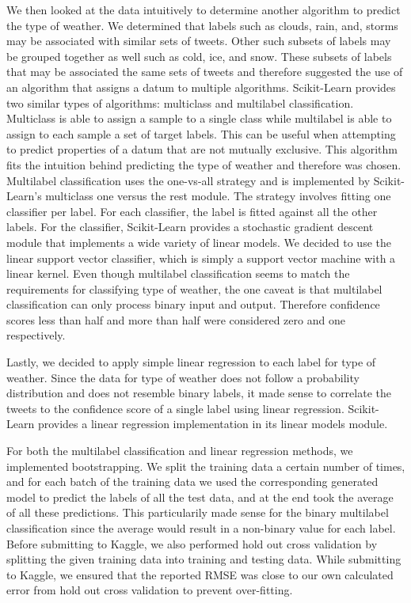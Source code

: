 \documentclass{article}
\begin{document}
We then looked at the data intuitively to determine another algorithm to predict the type of weather. We determined that labels such as clouds, rain, and, storms may be associated with similar sets of tweets. Other such subsets of labels may be grouped together as well such as cold, ice, and snow. These subsets of labels that may be associated the same sets of tweets and therefore suggested the use of an algorithm that assigns a datum to multiple algorithms. Scikit-Learn provides two similar types of algorithms: multiclass and multilabel classification. Multiclass is able to assign a sample to a single class while multilabel is able to assign to each sample a set of target labels. This can be useful when attempting to predict properties of a datum that are not mutually exclusive. This algorithm fits the intuition behind predicting the type of weather and therefore was chosen. Multilabel classification uses the one-vs-all strategy and is implemented by Scikit-Learn's multiclass one versus the rest module. The strategy involves fitting one classifier per label. For each classifier, the label is fitted against all the other labels. For the classifier, Scikit-Learn provides a stochastic gradient descent module that implements a wide variety of linear models. We decided to use the linear support vector classifier, which is simply a support vector machine with a linear kernel. Even though multilabel classification seems to match the requirements for classifying type of weather, the one caveat is that multilabel classification can only process binary input and output. Therefore confidence scores less than half and more than half were considered zero and one respectively.


Lastly, we decided to apply simple linear regression to each label for type of weather. Since the data for type of weather does not follow a probability distribution and does not resemble binary labels, it made sense to correlate the tweets to the confidence score of a single label using linear regression. Scikit-Learn provides a linear regression implementation in its linear models module.

For both the multilabel classification and linear regression methods, we implemented bootstrapping. We split the training data a certain number of times, and for each batch of the training data we used the corresponding generated model to predict the labels of all the test data, and at the end took the average of all these predictions. This particularily made sense for the binary multilabel classification since the average would result in a non-binary value for each label. Before submitting to Kaggle, we also performed hold out cross validation by splitting the given training data into training and testing data. While submitting to Kaggle, we ensured that the reported RMSE was close to our own calculated error from hold out cross validation to prevent over-fitting.
\end{document}
